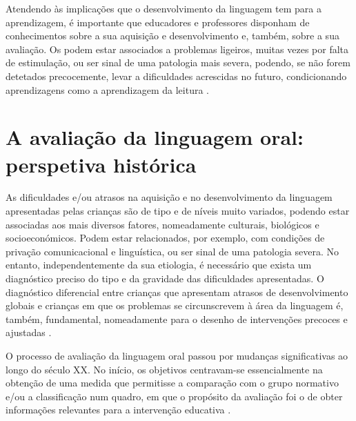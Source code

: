 \documentclass[output=paper]{LSP/langsci}
\begin{document}
Atendendo às implicações que o desenvolvimento da linguagem tem para a aprendizagem, é importante que educadores e professores disponham de conhecimentos sobre a sua aquisição e desenvolvimento e, também, sobre a sua avaliação. Os  podem estar associados a problemas ligeiros, muitas vezes por falta de estimulação, ou ser sinal de uma patologia mais severa, podendo, se não forem detetados precocemente, levar a dificuldades acrescidas no futuro, condicionando aprendizagens como a aprendizagem da leitura \citep{mcguinness2006}. 

\section{A avaliação da linguagem oral: perspetiva histórica}
\label{sec:viana_avaliacao_historica}

As dificuldades e/ou atrasos na aquisição e no desenvolvimento da linguagem apresentadas pelas crianças são de tipo e de níveis muito variados, podendo estar associadas aos mais diversos fatores, nomeadamente culturais, biológicos e socioeconómicos. Podem estar relacionados, por exemplo, com condições de privação comunicacional e linguística, ou ser sinal de uma patologia severa. No entanto, independentemente da sua etiologia, é necessário que exista um diagnóstico preciso do tipo e da gravidade das dificuldades apresentadas. O diagnóstico diferencial entre crianças que apresentam atrasos de desenvolvimento globais e crianças em que os problemas se circunscrevem à área da linguagem é, também, fundamental, nomeadamente para o desenho de intervenções precoces e ajustadas \citep{mariscallopezornat2010,mariscal_etal2007,neaum2012,westerlund_etal2006}. 

O processo de avaliação da linguagem oral passou por mudanças significativas ao longo do século XX. No início, os objetivos centravam-se essencialmente na obtenção de uma medida que permitisse a comparação com o grupo normativo e/ou a classificação num quadro, em que o propósito da avaliação foi o de obter informações relevantes para a intervenção educativa \citep{puyuelo2003}.
\end{document}
